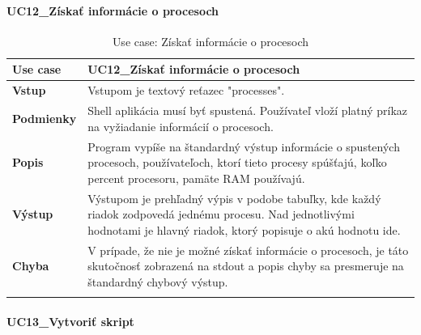 {\begin{center}
\begin{longtable}{|p{2.5cm}|p{12.2cm}|}
	\end{longtable}
\end{center}

\paragraph{UC12\_Získať informácie o procesoch}
\begin{center}
	\begin{longtable}{|p{2.5cm}|p{12.2cm}|}
		
			\hline
			\textbf{Use case} & UC12\_Získať informácie o procesoch \\ 
			\hline
			\textbf{Vstup} & Vstupom je textový reťazec "processes".\\
			\hline
			\textbf{Podmienky} & Shell aplikácia musí byť spustená. Používateľ vloží platný príkaz na vyžiadanie informácií o procesoch. \\ 
			\hline

			\textbf{Popis} & Program vypíše na štandardný výstup informácie o spustených procesoch, používateľoch, ktorí tieto procesy spúšťajú, koľko percent procesoru, pamäte RAM používajú.\\ 
			\hline

			\textbf{Výstup} & Výstupom je prehľadný výpis v podobe tabuľky, kde každý riadok zodpovedá jednému procesu. Nad jednotlivými hodnotami je hlavný riadok, ktorý popisuje o akú hodnotu ide.\\
			\hline
			\textbf{Chyba} & V prípade, že nie je možné získať informácie o procesoch, je táto skutočnosť zobrazená na stdout a popis chyby sa presmeruje na štandardný chybový výstup.\\
			\hline
		\caption{Use case: Získať informácie o procesoch}
		\label{table:1}
		
	\end{longtable}
\end{center}
\paragraph{UC13\_Vytvoriť skript}
\begin{center}
	\begin{longtable}{|p{2.5cm}|p{12.2cm}|}
		

\end{longtable}
\end{center}}
